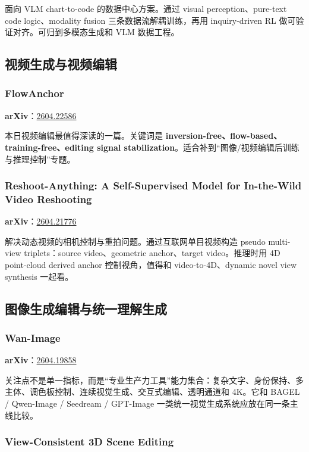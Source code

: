 面向 VLM chart-to-code 的数据中心方案。通过 visual perception、pure-text code logic、modality fusion 三条数据流解耦训练，再用 inquiry-driven RL 做可验证对齐。可归到多模态生成和 VLM 数据工程。

\subsection{视频生成与视频编辑}

\subsubsection{FlowAnchor}

\textbf{arXiv}：\href{https://arxiv.org/abs/2604.22586}{2604.22586}

本日视频编辑最值得深读的一篇。关键词是 \textbf{inversion-free、flow-based、training-free、editing signal stabilization}。适合补到“图像/视频编辑后训练与推理控制”专题。

\subsubsection{Reshoot-Anything: A Self-Supervised Model for In-the-Wild Video Reshooting}

\textbf{arXiv}：\href{https://arxiv.org/abs/2604.21776}{2604.21776}

解决动态视频的相机控制与重拍问题。通过互联网单目视频构造 pseudo multi-view triplets：source video、geometric anchor、target video。推理时用 4D point-cloud derived anchor 控制视角，值得和 video-to-4D、dynamic novel view synthesis 一起看。

\subsection{图像生成编辑与统一理解生成}

\subsubsection{Wan-Image}

\textbf{arXiv}：\href{https://arxiv.org/abs/2604.19858}{2604.19858}

关注点不是单一指标，而是“专业生产力工具”能力集合：复杂文字、身份保持、多主体、调色板控制、连续视觉生成、交互式编辑、透明通道和 4K。它和 BAGEL / Qwen-Image / Seedream / GPT-Image 一类统一视觉生成系统应放在同一条主线比较。

\subsubsection{View-Consistent 3D Scene Editing}

